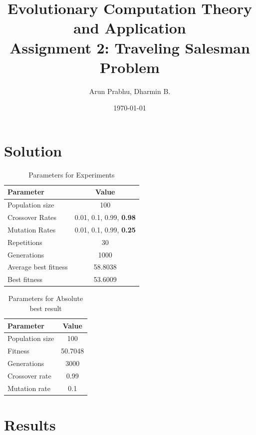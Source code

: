 \documentclass[a4paper, 12pt]{article}
\title{Evolutionary Computation Theory and Application  \\
				Assignment 2: Traveling Salesman Problem}
\author{Arun Prabhu, Dharmin B.}
\date{\today{}}
\begin{document}
\maketitle


\section{Solution}

\begin{table} [h!]
	  \centering
    \begin{tabular}{|l|c|}
    \hline
    \textbf{Parameter} & \textbf{Value}   \\\hline
    Population size & 100 \\\hline
    Crossover Rates &  0.01, 0.1, 0.99, \textbf{0.98}\\\hline
    Mutation Rates & 0.01, 0.1, 0.99, \textbf{0.25}\\\hline
    Repetitions & 30 \\\hline
    Generations & 1000 \\\hline
    Average best fitness		 & 58.8038 \\\hline
    Best fitness & 53.6009 \\\hline
    \end{tabular}
\caption{Parameters for Experiments}
\label{table:defparams}
\end{table}

\begin{table}[h!]
    \centering
    \label{tab:label}
    \begin{tabular}{|l|c|}\hline
        \textbf{Parameter} & \textbf{Value} \\\hline
        Population size & 100 \\\hline
        Fitness & 50.7048 \\\hline
        Generations & 3000 \\\hline
        Crossover rate & 0.99 \\\hline
        Mutation rate & 0.1 \\\hline
    \end{tabular}
    \caption{Parameters for Absolute best result}
\end{table}
\newpage
\section{Results}
\end{document}
